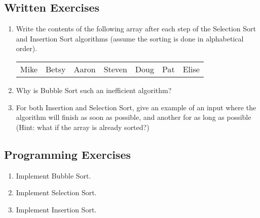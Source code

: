 \subsection{Written Exercises}

\setcounter{counter}{1}
\begin{enumerate}[label={\arabic{counter}\addtocounter{counter}{1}}.]

\item Write the contents of the following array after each step of the Selection Sort and Insertion Sort algorithms (assume the sorting is done in alphabetical order).
\begin{table}
\begin{tabular}{l l l l l l l}
Mike & Betsy & Aaron & Steven & Doug & Pat & Elise
\end{tabular}
\end{table}

\item Why is Bubble Sort such an inefficient algorithm?

\item For both Insertion and Selection Sort, give an example of an input where the algorithm will finish as soon as possible, and another for as long as possible (Hint: what if the array is already sorted?)

\end{enumerate}

\subsection{Programming Exercises}

\setcounter{counter}{1}
\begin{enumerate}[label={\arabic{counter}\addtocounter{counter}{1}}.]

\item Implement Bubble Sort.
\item Implement Selection Sort.
\item Implement Insertion Sort.

\end{enumerate}